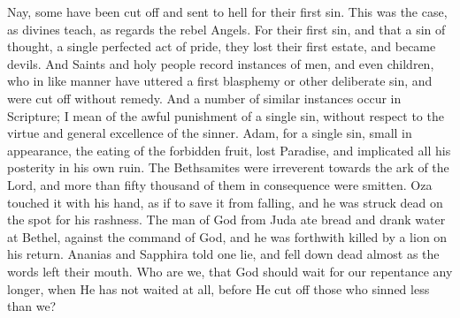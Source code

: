 Nay, some have been cut off and sent to hell for their first sin.
This was the case, as divines teach, as regards the rebel Angels. For
their first sin, and that a sin of thought, a single perfected act of
pride, they lost their first estate, and became devils. And Saints and
holy people record instances of men, and even children, who in like
manner have uttered a first blasphemy or other deliberate sin, and
were cut off without remedy. And a number of similar instances occur
in Scripture; I mean of the awful punishment of a single sin, without
respect to the virtue and general excellence of the sinner. Adam, for
a single sin, small in appearance, the eating of the forbidden fruit,
lost Paradise, and implicated all his posterity in his own ruin. The
Bethsamites were irreverent towards the ark of the Lord, and more than
fifty thousand of them in consequence were smitten. Oza touched it
with his hand, as if to save it from falling, and he was struck dead
on the spot for his rashness. The man of God from Juda ate bread and
drank water at Bethel, against the command of God, and he was
forthwith killed by a lion on his return. Ananias and Sapphira told
one lie, and fell down dead almost as the words left their mouth. Who
are we, that God should wait for our repentance any longer, when He
has not waited at all, before He cut off those who sinned less than
we?

